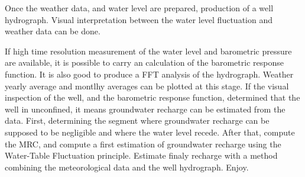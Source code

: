\documentclass[WHATMANUAL.tex]{subfiles}
\begin{document}
Once the weather data, and water level are prepared, production of a well hydrograph. Visual interpretation between the water level  fluctuation and weather data can be done.

If high time resolution measurement of the water level and barometric pressure are available, it is possible to carry an calculation of the barometric response function. It is also good to produce a FFT analysis of the hydrograph.
Weather yearly average and montlhy averages can be plotted at this stage.
If the visual inspection of the well, and the barometric response function, determined that the well in unconfined, it means groundwater recharge can be estimated from the data. First, determining the segment where groundwater recharge can be supposed to be negligible and where the water level recede. After that, compute the MRC, and compute a first estimation of groundwater recharge using the Water-Table Fluctuation principle. Estimate finaly recharge with a method combining the meteorological data and the well hydrograph. Enjoy.
\end{document}

